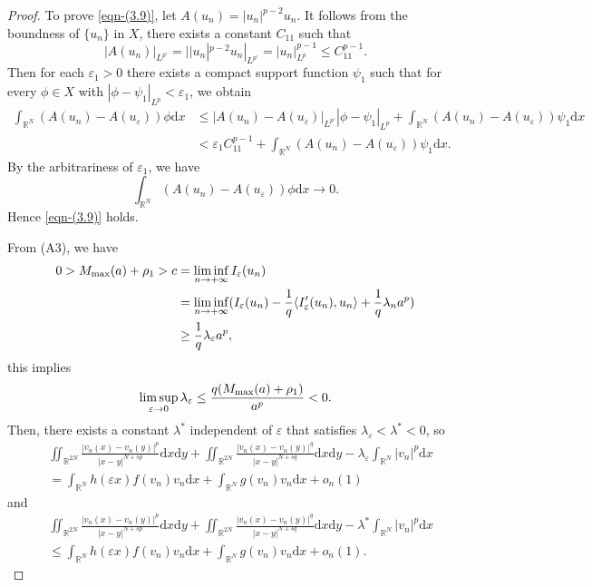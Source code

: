 \documentclass[reqno]{amsart}
\begin{document}
\begin{proof}
To prove \eqref{eqn-(3.9)}, let $A(u_n)=|u_n|^{p-2}u_n$. It follows from the 
boundness of $\{u_n\}$ in $X$, there exists a constant $C_{11}$ such that
$$
|A(u_n)|_{L^{p'}}=||u_n|^{p-2}u_n|_{L^{p'}}=|u_n|_{L^p}^{p-1}\le C_{11}^{p-1}.
$$
Then for each $ \varepsilon_1>0$ there exists a compact support function $\psi_1$ 
such that for every $\phi\in X$ with $|\phi-\psi_1|_{L^p}<\varepsilon_1$,
we  obtain
\begin{align*}
\int_{\mathbb{R}^N}(A(u_n)-A(u_\varepsilon))\phi\mathrm{d}x
&\leq |A(u_n)-A(u_\varepsilon)|_{L^{p'}}|\phi-\psi_1|_{L^p}
 +\int_{\mathbb{R}^N}(A(u_n)-A(u_\varepsilon))\psi_1\mathrm{d}x\\
&<\varepsilon_1 C_{11}^{p-1}+\int_{\mathbb{R}^N}(A(u_n)-A(u_\varepsilon))
 \psi_1\mathrm{d}x.
\end{align*}
By the arbitrariness of $\varepsilon_1$, we have
$$
\int_{\mathbb{R}^N}(A(u_n)-A(u_\varepsilon))\phi\mathrm{d}x\to 0.
$$
Hence \eqref{eqn-(3.9)} holds.

From (A3), we have
\begin{align*}
0> M_{\rm max}(a) + \rho_1>c
&=\liminf_{n\to+\infty}I_\varepsilon(u_n)\\
&=\liminf_{n\to+\infty}(I_\varepsilon(u_n)
 -\frac{1}{q}\langle I_{\varepsilon}' (u_n),u_n\rangle+\frac{1}{q}\lambda_n a^{p})\\
&\ge\frac{1}{q}\lambda_\varepsilon a^{p},
\end{align*}
this implies
$$
\limsup_{\varepsilon\to0}\lambda_\varepsilon\le\frac{q(M_{\rm max}(a) 
+ \rho_1)}{a^{p}}<0.
$$
Then, there exists a constant $\lambda^{*}$ independent of $\varepsilon$
that satisfies $\lambda_\varepsilon<\lambda^{*}<0$, so
\begin{align*}
&\iint_{\mathbb{R}^{2N}}\frac{|v_n(x)-v_n(y)|^{p}}{|x-y|^{N+sp}}
 \mathrm{d}x\mathrm{d}y
 +\iint_{\mathbb{R}^{2N}}\frac{|v_n(x)-v_n(y)|^{q}}{|x-y|^{N+sq}}
 \mathrm{d}x\mathrm{d}y-\lambda_\varepsilon\int_{\mathbb{R}^N}| v_n|^{p}\mathrm{d}x\\
&=\int_{\mathbb{R}^N}h(\varepsilon x)f(v_n)v_n\mathrm{d}x
 +\int_{\mathbb{R}^N}g(v_n)v_n\mathrm{d}x+o_n(1)
\end{align*}
and
\begin{align*}
&\iint_{\mathbb{R}^{2N}}\frac{|v_n(x)-v_n(y)|^{p}}{|x-y|^{N+sp}}
 \mathrm{d}x\mathrm{d}y+\iint_{\mathbb{R}^{2N}}
 \frac{|v_n(x)-v_n(y)|^{q}}{|x-y|^{N+sq}}\mathrm{d}x\mathrm{d}y
 -\lambda^{*}\int_{\mathbb{R}^N}| v_n|^{p}\mathrm{d}x\\
&\le\int_{\mathbb{R}^N}h(\varepsilon x)f(v_n)v_n\mathrm{d}x
 +\int_{\mathbb{R}^N}g(v_n)v_n\mathrm{d}x+o_n(1).
\end{align*}


\end{proof}
\end{document}
